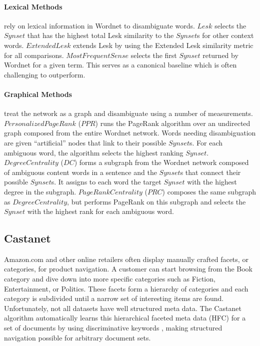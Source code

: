 \documentclass[a4paper,11pt]{article}
\begin{document}
\paragraph{Lexical Methods} rely on lexical information in Wordnet to disambiguate words.  $Lesk$ \cite{lesk86wsd} selects the $Synset$ that has the highest total Lesk similarity to the $Synset$s for other context words.  $ExtendedLesk$ \cite{banerjee03extlesk} extends Lesk by using the Extended Lesk similarity metric for all comparisons.  $MostFrequentSense$ selects the first $Synset$ returned by Wordnet for a given term.  This serves as a canonical baseline which is often challenging to outperform.

\paragraph{Graphical Methods} treat the network as a graph and disambiguate using a number of measurements.  $PersonalizedPageRank$ \cite{agirre09wsd} ($PPR$) runs the PageRank algorithm over an undirected graph composed from the entire Wordnet network.  Words needing disambiguation are given ``artificial'' nodes that link to their possible $Synset$s.  For each ambiguous word, the algorithm selects the highest ranking $Synset$.  $DegreeCentrality$ \cite{navigli10graph} ($DC$) forms a subgraph from the Wordnet network composed of ambiguous content words in a sentence and the $Synset$s that connect their possible $Synset$s.  It assigns to each word the target $Synset$ with the highest degree in the subgraph. $PageRankCentrality$ \cite{navigli10graph} ($PRC$) composes the same subgraph as $DegreeCentrality$, but performs PageRank on this subgraph and selects the $Synset$ with the highest rank for each ambiguous word.

\subsection{Castanet}

Amazon.com and other online retailers often display manually crafted facets, or
categories, for product navigation.  A customer can start browsing from the Book
category and dive down into more specific categories such as Fiction,
Entertainment, or Politics.  These facets form a hierarchy of categories and
each category is subdivided until a narrow set of interesting items are found.
Unfortunately, not all datasets have well structured meta data.  The Castanet
algorithm automatically learns this hierarchical faceted meta data (HFC) for a
set of documents by using discriminative keywords
\cite{stoica07automatingcreation}, making structured navigation possible for
arbitrary document sets.
\end{document}
